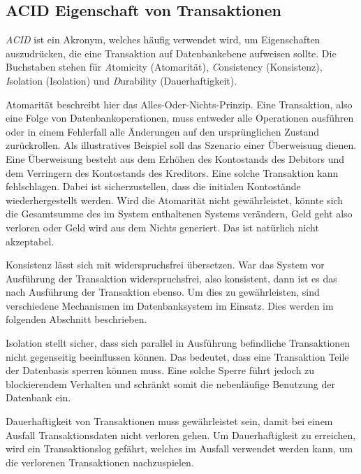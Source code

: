 \subsection{ACID Eigenschaft von Transaktionen}
\textit{ACID} ist ein Akronym, welches häufig verwendet wird, um Eigenschaften auszudrücken, die eine Transaktion auf Datenbankebene aufweisen sollte. Die Buchstaben stehen für \textit{A}tomicity (Atomarität), \textit{C}onsistency (Konsistenz), \textit{I}solation (Isolation) und \textit{D}urability (Dauerhaftigkeit). 

\par Atomarität beschreibt hier das Alles-Oder-Nichts-Prinzip. Eine Transaktion, also eine Folge von Datenbankoperationen, muss entweder alle Operationen ausführen oder in einem Fehlerfall alle Änderungen auf den ursprünglichen Zustand zurückrollen. Als illustratives Beispiel soll das Szenario einer Überweisung dienen. Eine Überweisung besteht aus dem Erhöhen des Kontostands des Debitors und dem Verringern des Kontostands des Kreditors. Eine solche Transaktion kann fehlschlagen. Dabei ist sicherzustellen, dass die initialen Kontostände wiederhergestellt werden. Wird die Atomarität nicht gewährleistet, könnte sich die Gesamtsumme des im System enthaltenen Systems verändern, Geld geht also verloren oder Geld wird aus dem Nichts generiert. Das ist natürlich nicht akzeptabel. 

\par Konsistenz lässt sich mit widerspruchsfrei übersetzen. War das System vor Ausführung der Transaktion widerspruchsfrei, also konsistent, dann ist es das nach Ausführung der Transaktion ebenso. Um dies zu gewährleisten, sind verschiedene Mechanismen im Datenbanksystem im Einsatz. Dies werden im folgenden Abschnitt beschrieben.

\par Isolation stellt sicher, dass sich parallel in Ausführung befindliche Transaktionen nicht gegenseitig beeinflussen können. Das bedeutet, dass eine Transaktion Teile der Datenbasis sperren können muss. Eine solche Sperre führt jedoch zu blockierendem Verhalten und schränkt somit die nebenläufige Benutzung der Datenbank ein. 

\par Dauerhaftigkeit von Transaktionen muss gewährleistet sein, damit bei einem Ausfall Transaktionsdaten nicht verloren gehen. Um Dauerhaftigkeit zu erreichen, wird ein Transaktionslog gefährt, welches im Ausfall verwendet werden kann, um die verlorenen Transaktionen nachzuspielen. 

